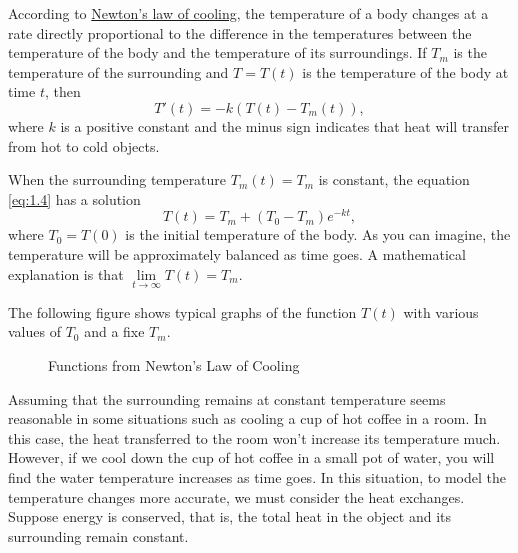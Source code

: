 \begin{example}
  According to \href{https://en.wikipedia.org/wiki/Newton\%27s_law_of_cooling}{Newton’s law of cooling}, the temperature of a body changes at a rate directly proportional to the difference in the temperatures between the temperature of the body and the temperature of its surroundings. If $T_m$ is the temperature of the surrounding and $T = T(t)$ is the temperature of the body at time $t$, then
  \begin{equation}
    T'(t) = -k(T(t) - T_m(t)),
    \label{eq:1.4}
  \end{equation}
  where $k$ is a positive constant and the minus sign indicates that heat will transfer from hot to cold objects.

  When the surrounding temperature $T_m(t)=T_m$ is constant, the equation \ref{eq:1.4} has a solution
  $$
    T(t)= T_m + (T_0 - T_m)e^{-kt},
  $$
  where $T_0=T(0)$ is the initial temperature of the body. As you can imagine, the temperature will be approximately balanced as time goes. A mathematical explanation is that $\lim\limits_{t\to \infty} T(t) = T_m$.


  The following figure shows typical graphs of the function $T(t)$ with various values of $T_0$ and a fixe $T_m$.
  \begin{figure}[hbt!]
    \centering
    \caption{Functions from Newton's Law of Cooling}
  \end{figure}

  Assuming that the surrounding remains at constant temperature seems reasonable in some situations such as cooling a cup of hot coffee in a room. In this case, the heat transferred to the room won't increase its temperature much. However, if we cool down the cup of hot coffee in a small pot of water, you will find the water temperature increases as time goes. In this situation, to model the temperature changes more accurate, we must consider the heat exchanges. Suppose energy is conserved, that is, the total heat in the object and its surrounding remain constant.


\end{example}

